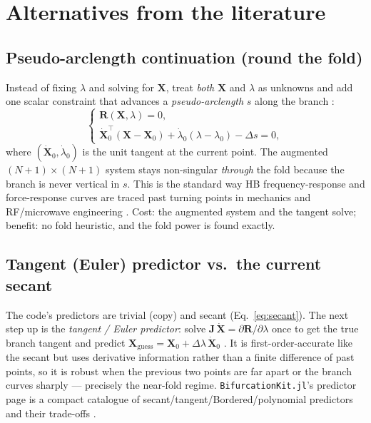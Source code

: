 \documentclass[11pt]{article}
\newcommand{\code}[1]{\texttt{\small #1}}
\newcommand{\Res}{\mathbf{R}}
\newcommand{\Xv}{\mathbf{X}}
\newcommand{\Jac}{\mathbf{J}}
\begin{document}
\section{Alternatives from the literature}
\label{sec:alternatives}

\subsection{Pseudo-arclength continuation (round the fold)}
Instead of fixing $\lambda$ and solving for $\Xv$, treat \emph{both} $\Xv$ and
$\lambda$ as unknowns and add one scalar constraint that advances a
\emph{pseudo-arclength} $s$ along the branch \cite{Keller1977}:
\begin{equation}
  \begin{cases}
    \Res(\Xv,\lambda) = 0,\\[2pt]
    \dot{\Xv}_0^{\!\top}(\Xv - \Xv_0) + \dot{\lambda}_0(\lambda - \lambda_0) - \Delta s = 0,
  \end{cases}
  \label{eq:pal}
\end{equation}
where $(\dot{\Xv}_0,\dot{\lambda}_0)$ is the unit tangent at the current point.
The augmented $(N{+}1)\times(N{+}1)$ system stays non-singular \emph{through} the
fold because the branch is never vertical in $s$. This is the standard way HB
frequency-response and force-response curves are traced past turning points in
mechanics and RF/microwave engineering
\cite{ArclengthHB_Rotor,AllgowerGeorg2003}. Cost: the augmented system and the
tangent solve; benefit: no fold heuristic, and the fold power is found exactly.

\subsection{Tangent (Euler) predictor vs.\ the current secant}
The code's predictors are trivial (copy) and secant
(Eq.~\ref{eq:secant}). The next step up is the \emph{tangent / Euler predictor}:
solve $\Jac\,\dot{\Xv} = \partial\Res/\partial\lambda$ once to get the true
branch tangent and predict $\Xv_{\text{guess}} = \Xv_0 + \Delta\lambda\,
\dot{\Xv}_0$ \cite{AllgowerGeorg2003}. It is first-order-accurate like the
secant but uses derivative information rather than a finite difference of past
points, so it is robust when the previous two points are far apart or the branch
curves sharply --- precisely the near-fold regime. \code{BifurcationKit.jl}'s
predictor page is a compact catalogue of secant/tangent/Bordered/polynomial
predictors and their trade-offs \cite{BifurcationKitPred}.
\end{document}
